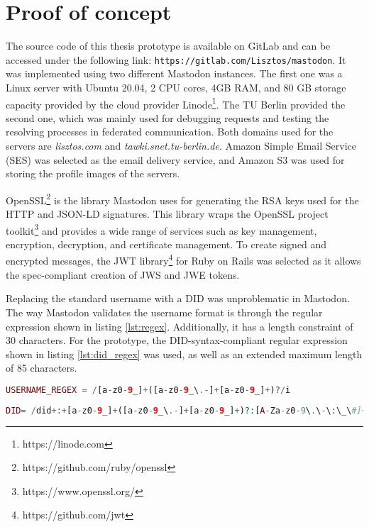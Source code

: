 \section{Proof of concept}

The source code of this thesis prototype is available on GitLab and can be accessed under the following link: \verb|https://gitlab.com/Lisztos/mastodon|. It was implemented using two different Mastodon instances. The first one was a Linux server with Ubuntu 20.04, 2 CPU cores,  4GB RAM, and 80 GB storage capacity provided by the cloud provider Linode\footnote{https://linode.com}. The TU Berlin provided the second one, which was mainly used for debugging requests and testing the resolving processes in federated communication. Both domains used for the servers are \emph{lisztos.com} and \emph{tawki.snet.tu-berlin.de}. Amazon Simple Email Service (SES) was selected as the email delivery service, and Amazon S3 was used for storing the profile images of the servers.

OpenSSL\footnote{https://github.com/ruby/openssl} is the library Mastodon uses for generating the RSA keys used for the HTTP and JSON-LD signatures. This library wraps the OpenSSL project toolkit\footnote{https://www.openssl.org/} and provides a wide range of services such as key management, encryption, decryption, and certificate management. To create signed and encrypted messages, the JWT library\footnote{https://github.com/jwt} for Ruby on Rails was selected as it allows the spec-compliant creation of JWS and JWE tokens.


Replacing the standard username with a DID was unproblematic in Mastodon. The way Mastodon validates the username format is through the regular expression shown in listing \ref{lst:regex}. Additionally, it has a length constraint of 30 characters. For the prototype, the DID-syntax-compliant regular expression shown in listing \ref{lst:did_regex} was used, as well as an extended maximum length of 85 characters.

\lstset{style=JSONStyle}
\begin{lstlisting}[language=PHP, caption=Mastodon username regex, label=lst:regex, float=h!]
USERNAME_REGEX = /[a-z0-9_]+([a-z0-9_\.-]+[a-z0-9_]+)?/i
\end{lstlisting}

\lstset{style=JSONStyle}
\begin{lstlisting}[language=PHP, caption= Regex for DID used in the prototype, label=lst:did_regex, float=h!]
DID= /did+:+[a-z0-9_]+([a-z0-9_\.-]+[a-z0-9_]+)?:[A-Za-z0-9\.\-\:\_\#]+/i 
\end{lstlisting}

